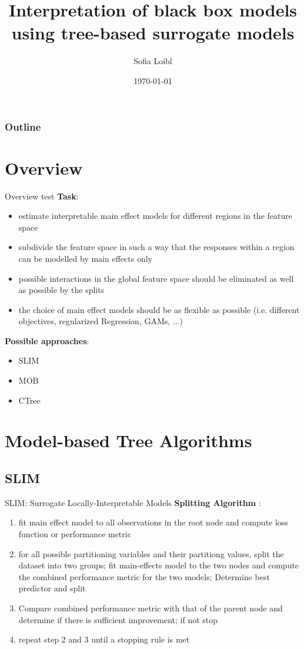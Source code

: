 \documentclass[9pt, xcolor=table]{beamer}
\title[Interpretation of black box models]{Interpretation of black box models using tree-based surrogate models}
\author[Sofia Loibl]{Sofia Loibl}
\institute[LMU]{LMU München}
\date{\today}
\begin{document}
\begin{frame}
\titlepage 
\end{frame}

\begin{frame}
\frametitle{Outline} 
\tableofcontents 
\end{frame}

\section{Overview}
\begin{frame}{Overview}
test
\textbf{Task}:
\begin{itemize}
    \item estimate interpretable main effect models for different regions in the feature space
    \item subdivide the feature space in such a way that the responses within a region can be modelled by main effects only
    \item possible interactions in the global feature space should be eliminated as well as possible by the splits
    \item the choice of main effect models should be as flexible as possible (i.e. different objectives, regularized Regression, GAMs, ...)
\end{itemize}
    
\vspace{0.5cm}

\textbf{Possible approaches}: 
\begin{itemize}
    \item SLIM
    \item MOB
    \item CTree
\end{itemize}
\end{frame}


\section{Model-based Tree Algorithms}
\subsection{SLIM}
\begin{frame}{SLIM: Surrogate Locally-Interpretable Models}
\textbf{Splitting Algorithm} \citep{Hu.2020}:
\begin{enumerate}
    \item fit main effect model to all observations in the root node and compute loss function or performance metric
    \item for all possible partitioning variables and their partitiong values, split the dataset into two groups; fit main-effects model to the two nodes and compute the combined performance metric for the two models; Determine best predictor and split
    \item Compare combined performance metric with that of the parent node and determine if there is sufficient improvement; if not stop
    \item repeat step 2 and 3 until a stopping rule is met
\end{enumerate}
    
\end{frame}
\end{document}

